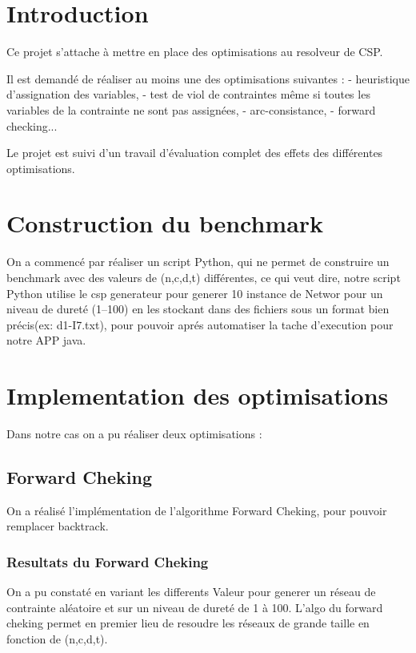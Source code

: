 \documentclass[oneside,13pt,a4paper]{article}
\begin{document}

\parskip=5pt



\parskip=5pt

\section{Introduction}
Ce projet s'attache à mettre en place des optimisations au resolveur de CSP.

Il est demandé de réaliser au moins une des optimisations suivantes : 
- heuristique d'assignation des variables, 
- test de viol de contraintes même si toutes les variables de la contrainte ne sont pas assignées, 
- arc-consistance, 
- forward checking...

Le projet est suivi d'un travail d'évaluation complet des effets des différentes optimisations.


\section {Construction du benchmark}
On a commencé par réaliser un script Python, qui ne permet de construire un benchmark avec des valeurs  de (n,c,d,t) différentes, ce qui veut dire, notre script Python utilise le csp generateur pour generer 10 instance de Networ pour un  niveau de dureté (1--100) en les stockant dans des fichiers sous un format bien précis(ex: d1-I7.txt), pour pouvoir aprés automatiser la tache d'execution pour notre APP java. 
\subsection{}

\section{Implementation des optimisations}
Dans notre cas on a pu réaliser deux optimisations : 
\subsection{Forward Cheking}

On a réalisé l'implémentation de l'algorithme Forward Cheking, pour pouvoir remplacer backtrack.
\subsubsection{Resultats du Forward Cheking }
On a pu constaté en variant les differents Valeur pour generer un réseau de contrainte aléatoire et sur un niveau de dureté de 1 à 100. L'algo du forward cheking permet en premier lieu de resoudre les réseaux de grande taille en fonction de (n,c,d,t).
\end{document}
